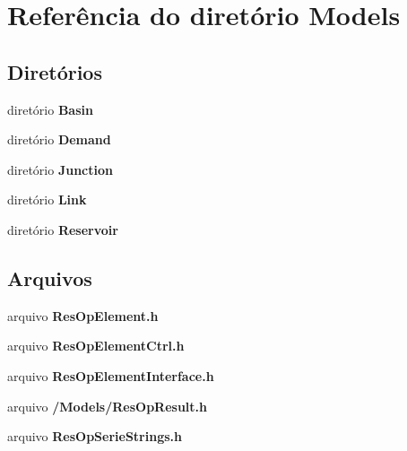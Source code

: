\section{Referência do diretório Models}
\label{dir_25b0cc9624daa9029d44e056dc8737f9}
\subsection*{Diretórios}
\begin{DoxyCompactItemize}
\item 
diretório {\bf Basin}
\item 
diretório {\bf Demand}
\item 
diretório {\bf Junction}
\item 
diretório {\bf Link}
\item 
diretório {\bf Reservoir}
\end{DoxyCompactItemize}
\subsection*{Arquivos}
\begin{DoxyCompactItemize}
\item 
arquivo {\bf Res\+Op\+Element.\+h}
\item 
arquivo {\bf Res\+Op\+Element\+Ctrl.\+h}
\item 
arquivo {\bf Res\+Op\+Element\+Interface.\+h}
\item 
arquivo {\bf /\+Models/\+Res\+Op\+Result.\+h}
\item 
arquivo {\bf Res\+Op\+Serie\+Strings.\+h}
\end{DoxyCompactItemize}
